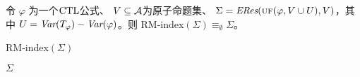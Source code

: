 \begin{corollary}
	令 $\varphi$ 为一个$\textrm{CTL}$公式、 $V\subseteq\cal A$为原子命题集、
	$\Sigma=\emph{ERes}(\textsc{uf}(\varphi,V\cup U),V)$，其中 $U=\textit{Var}(T_\varphi)-\textit{Var}(\varphi)$。则
	RM-index$(\Sigma)\equiv_\emptyset \Sigma$。
\end{corollary}



\begin{algorithm}[tb]
	\caption{{RM-index}$(\Sigma)$}
	\label{alg:remove:index}
	\LinesNumbered
	\ForEach{$\Sigma$中拥有相同索引$\tuple{i}$的$\EXIST$-子句构成的极大子集$\Delta$}{
		\If{存在索引为$\tuple{i}$的$\EXIST$-某时子句$\alpha\in\Sigma$}
		{
			\lForEach{$\beta\in rei(\Delta)$}{
				$\Sigma\lto \Sigma \cup rfi(\alpha,\beta)$
			}
			$\Sigma\lto \Sigma-\{\alpha\}$\;
		}
		$\Sigma\lto \Sigma -\Delta \cup  rxi(\Delta)$\;
	}
	\Return $\Sigma$
\end{algorithm}

%	


